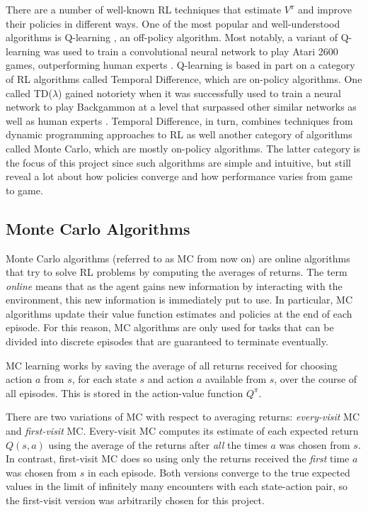 \documentclass[11pt,a4paper]{report}
\begin{document}
There are a number of well-known RL techniques that estimate $V^{\pi}$ and improve their policies in different ways. One of the most popular and well-understood \cite{challenges-of-rl} algorithms is Q-learning \cite{q-learning}, an off-policy algorithm. Most notably, a variant of Q-learning was used to train a convolutional neural network to play Atari 2600 games, outperforming human experts \cite{atari}. Q-learning is based in part on a category of RL algorithms called Temporal Difference, which are on-policy algorithms. One called TD($\lambda$) gained notoriety when it was successfully used to train a neural network to play Backgammon at a level that surpassed other similar networks as well as human experts \cite{backgammon}. Temporal Difference, in turn, combines techniques from dynamic programming approaches to RL as well another category of algorithms called Monte Carlo, which are mostly on-policy algorithms. The latter category is the focus of this project since such algorithms are simple and intuitive, but still reveal a lot about how policies converge and how performance varies from game to game.


\subsection{Monte Carlo Algorithms}
\label{sec:MonteCarloAlgorithms}

Monte Carlo algorithms (referred to as MC from now on) are online algorithms that try to solve RL problems by computing the averages of returns. The term \emph{online} means that as the agent gains new information by interacting with the environment, this new information is immediately put to use. In particular, MC algorithms update their value function estimates and policies at the end of each episode. For this reason, MC algorithms are only used for tasks that can be divided into discrete episodes that are guaranteed to terminate eventually.

MC learning works by saving the average of all returns received for choosing action $a$ from $s$, for each state $s$ and action $a$ available from $s$, over the course of all episodes. This is stored in the action-value function $Q^{\pi}$.

There are two variations of MC with respect to averaging returns: \emph{every-visit} MC and \emph{first-visit} MC. Every-visit MC computes its estimate of each expected return $Q(s,a)$ using the average of the returns after \emph{all} the times $a$ was chosen from $s$. In contrast, first-visit MC does so using only the returns received the \emph{first} time $a$ was chosen from $s$ in each episode. Both versions converge to the true expected values in the limit of infinitely many encounters with each state-action pair, so the first-visit version was arbitrarily chosen for this project.
\end{document}
